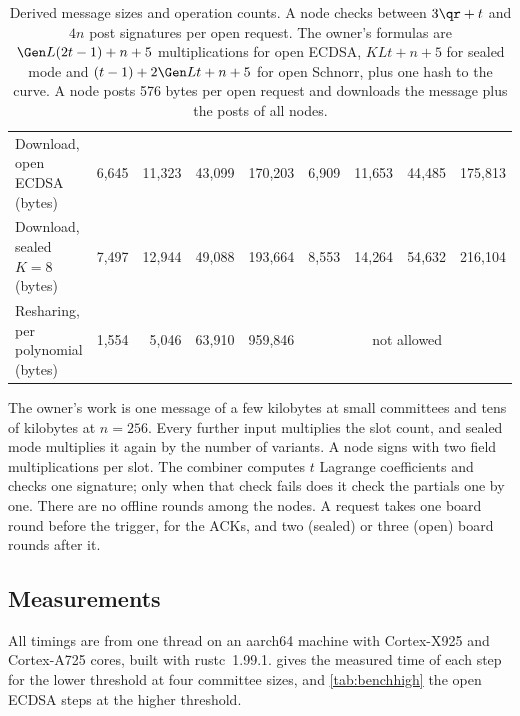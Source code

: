 \begin{table}[t]
\begin{tabular}{@{}l rrrr @{\quad} rrrr@{}}
Download, open ECDSA (bytes) & 6{,}645 & 11{,}323 & 43{,}099 & 170{,}203 & 6{,}909 & 11{,}653 & 44{,}485 & 175{,}813 \\
Download, sealed $K = 8$ (bytes) & 7{,}497 & 12{,}944 & 49{,}088 & 193{,}664 & 8{,}553 & 14{,}264 & 54{,}632 & 216{,}104 \\
Resharing, per polynomial (bytes) & 1{,}554 & 5{,}046 & 63{,}910 & 959{,}846 & \multicolumn{4}{c}{not allowed} \\
\bottomrule
\end{tabular}
\caption{Derived message sizes and operation counts. A node checks between $3\qr + t$ and $4n$ post signatures per open request. The owner's formulas are $\Gen L(2t-1) + n + 5$ multiplications for open ECDSA, $KLt + n + 5$ for sealed mode and $(t-1) + 2\Gen L t + n + 5$ for open Schnorr, plus one hash to the curve. A node posts 576 bytes per open request and downloads the message plus the posts of all nodes.}
\label{tab:sizes}
\end{table}

The owner's work is one message of a few kilobytes at small committees and tens of kilobytes at $n = 256$. Every further input multiplies the slot count, and sealed mode multiplies it again by the number of variants. A node signs with two field multiplications per slot. The combiner computes $t$ Lagrange coefficients and checks one signature; only when that check fails does it check the partials one by one. There are no offline rounds among the nodes. A request takes one board round before the trigger, for the ACKs, and two (sealed) or three (open) board rounds after it.

\subsection{Measurements}

All timings are from one thread on an aarch64 machine with Cortex-X925 and Cortex-A725 cores, built with rustc~1.99.1.  gives the measured time of each step for the lower threshold at four committee sizes, and \cref{tab:benchhigh} the open ECDSA steps at the higher threshold.

